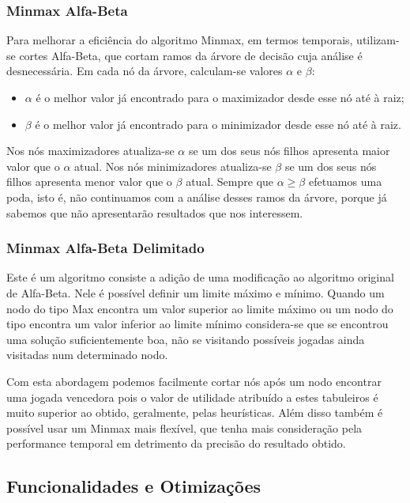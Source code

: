 \subsubsection{Minmax Alfa-Beta}

Para melhorar a eficiência do algoritmo Minmax, em termos temporais, utilizam-se cortes Alfa-Beta, que cortam ramos da árvore de decisão cuja análise é desnecessária. Em cada nó da árvore, calculam-se valores $\alpha$ e $\beta$:
\begin{itemize}
	\item $\alpha$ é o melhor valor já encontrado para o maximizador desde esse nó até à raiz;
	\item $\beta$ é o melhor valor já encontrado para o minimizador desde esse nó até à raiz.
\end{itemize}
Nos nós maximizadores atualiza-se $\alpha$ se um dos seus nós filhos apresenta maior valor que o $\alpha$ atual. Nos nós minimizadores atualiza-se $\beta$ se um dos seus nós filhos apresenta menor valor que o $\beta$ atual. Sempre que $\alpha \geq \beta$ efetuamos uma poda, isto é, não continuamos com a análise desses ramos da árvore, porque já sabemos que não apresentarão resultados que nos interessem. 

\subsubsection{Minmax Alfa-Beta Delimitado}

Este é um algoritmo consiste a adição de uma modificação ao algoritmo original de Alfa-Beta. Nele é possível definir um limite máximo e mínimo. Quando um nodo do tipo Max encontra um valor superior ao limite máximo ou um nodo do tipo  encontra um valor inferior ao limite mínimo considera-se que se encontrou uma solução suficientemente boa, não se visitando possíveis jogadas ainda visitadas num determinado nodo.

Com esta abordagem podemos facilmente cortar nós após um nodo encontrar uma jogada vencedora pois o valor de utilidade atribuído a estes tabuleiros é muito superior ao obtido, geralmente, pelas heurísticas. Além disso também é possível usar um Minmax mais flexível, que tenha mais consideração pela performance temporal em detrimento da precisão do resultado obtido.

\subsection{Funcionalidades e Otimizações}

